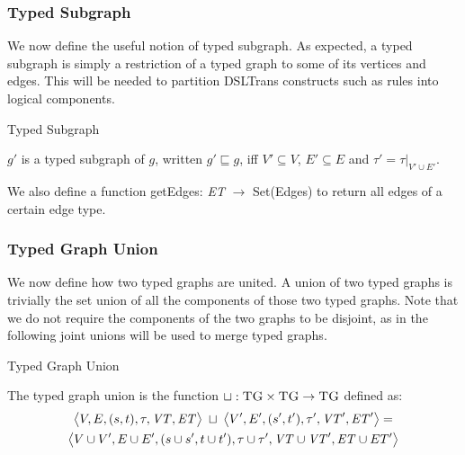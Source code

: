 \subsubsection*{Typed Subgraph}
We now define the useful notion of typed subgraph. As expected, a typed subgraph is simply a restriction of a typed graph to some of its vertices and edges. This will be needed to partition DSLTrans constructs such as rules into logical components.

\begin{definition}{Typed Subgraph\\}
\label{def:typedsubgraph}

$g'$ is a typed subgraph of $g$, written $g'\sqsubseteq g$, iff $V'\subseteq V$, $E'\subseteq E$ and $\tau'=\tau |_{V'\cup E'}$.

\end{definition}


We also define a function getEdges: \textit{ET} $\rightarrow$ Set(Edges) to return all edges of a certain edge type.


\subsubsection*{Typed Graph Union}
We now define how two typed graphs are united. A union of two typed graphs is trivially the set union of all the components of those two typed graphs. Note that we do not require the components of the two graphs to be disjoint, as in the following joint unions will be used to merge typed graphs.

\begin{definition}{Typed Graph Union\\}
\label{def:typed_graph_union}

The typed graph union is the function $\sqcup :\textsc{TG}\times \textsc{TG}\rightarrow \textsc{TG}$ defined as:
\begin{multline*}
\big\langle V,E,(s,t),\tau,\mathit{VT},\mathit{ET}\big\rangle\;\sqcup\;\big\langle V',E',(s',t'),\tau',\mathit{VT}',\mathit{ET}'\big\rangle=\\
\big\langle V\cup V', E\cup E',(s\cup s', t\cup t'), \tau\cup \tau', \mathit{VT}\cup \mathit{VT}', \mathit{ET}\cup ET'\big\rangle
\end{multline*}
\end{definition}

